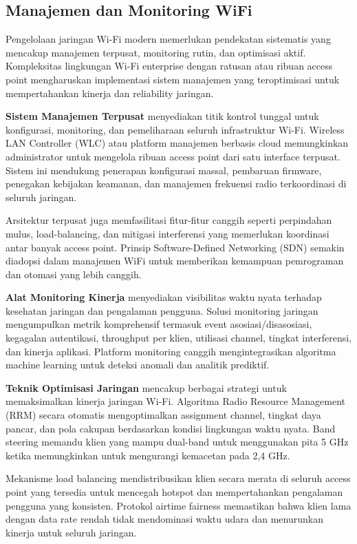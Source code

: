\subsection{Manajemen dan Monitoring WiFi}

Pengelolaan jaringan Wi-Fi modern memerlukan pendekatan sistematis yang mencakup manajemen terpusat, monitoring rutin, dan optimisasi aktif. Kompleksitas lingkungan Wi-Fi enterprise dengan ratusan atau ribuan access point mengharuskan implementasi sistem manajemen yang teroptimisasi untuk mempertahankan kinerja dan reliability jaringan.

\textbf{Sistem Manajemen Terpusat} menyediakan titik kontrol tunggal untuk konfigurasi, monitoring, dan pemeliharaan seluruh infrastruktur Wi-Fi. Wireless LAN Controller (WLC) atau platform manajemen berbasis cloud memungkinkan administrator untuk mengelola ribuan access point dari satu interface terpusat. Sistem ini mendukung penerapan konfigurasi massal, pembaruan firmware, penegakan kebijakan keamanan, dan manajemen frekuensi radio terkoordinasi di seluruh jaringan.

Arsitektur terpusat juga memfasilitasi fitur-fitur canggih seperti perpindahan mulus, load-balancing, dan mitigasi interferensi yang memerlukan koordinasi antar banyak access point. Prinsip Software-Defined Networking (SDN) semakin diadopsi dalam manajemen WiFi untuk memberikan kemampuan pemrograman dan otomasi yang lebih canggih.

\textbf{Alat Monitoring Kinerja} menyediakan visibilitas waktu nyata terhadap kesehatan jaringan dan pengalaman pengguna. Solusi monitoring jaringan mengumpulkan metrik komprehensif termasuk event asosiasi/disasosiasi, kegagalan autentikasi, throughput per klien, utilisasi channel, tingkat interferensi, dan kinerja aplikasi. Platform monitoring canggih mengintegrasikan algoritma machine learning untuk deteksi anomali dan analitik prediktif.

\textbf{Teknik Optimisasi Jaringan} mencakup berbagai strategi untuk memaksimalkan kinerja jaringan Wi-Fi. Algoritma Radio Resource Management (RRM) secara otomatis mengoptimalkan assignment channel, tingkat daya pancar, dan pola cakupan berdasarkan kondisi lingkungan waktu nyata. Band steering memandu klien yang mampu dual-band untuk menggunakan pita 5 GHz ketika memungkinkan untuk mengurangi kemacetan pada 2,4 GHz.

Mekanisme load balancing mendistribusikan klien secara merata di seluruh access point yang tersedia untuk mencegah hotspot dan mempertahankan pengalaman pengguna yang konsisten. Protokol airtime fairness memastikan bahwa klien lama dengan data rate rendah tidak mendominasi waktu udara dan menurunkan kinerja untuk seluruh jaringan.

